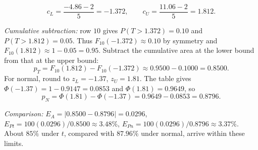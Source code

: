 \begin{enumerate}[leftmargin=*,label=\textbf{\arabic*.},itemsep=5pt]
		\[
		c_L=\frac{-4.86-2}{5}=-1.372,\qquad c_U=\frac{11.06-2}{5}=1.812.
		\]
		\par \textit{Cumulative subtraction:} row $10$ gives $P(T>1.372)=0.10$ and $P(T>1.812)=0.05$. Thus $F_{10}(-1.372)\approx0.10$ by symmetry and $F_{10}(1.812)\approx1-0.05=0.95$. Subtract the cumulative area at the lower bound from that at the upper bound:
		\[
		p_T=F_{10}(1.812)-F_{10}(-1.372)\approx0.9500-0.1000=0.8500.
		\]
		For normal, round to $z_L=-1.37$, $z_U=1.81$. The table gives $\Phi(-1.37)=1-0.9147=0.0853$ and $\Phi(1.81)=0.9649$, so
		\[
		p_N=\Phi(1.81)-\Phi(-1.37)=0.9649-0.0853=0.8796.
		\]
		\par \textit{Comparison:} $E_A=|0.8500-0.8796|=0.0296$, $E_{Pt}=100(0.0296)/0.8500\approx3.48\%$, $E_{Pn}=100(0.0296)/0.8796\approx3.37\%$. About $85\%$ under $t$, compared with $87.96\%$ under normal, arrive within these limits.
		
		
		

\end{enumerate}

